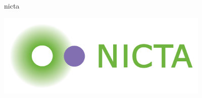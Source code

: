 \documentclass[a0,landscape]{a0poster}
\begin{document}
\begin{staticcontents*}{nicta}
\begin{staticfigure}
\begin{center}
\includegraphics[width=4in]{diagrams/nicta_logo.png}
\end{center}
\end{staticfigure}
\end{staticcontents*}






%
%
\end{document}
